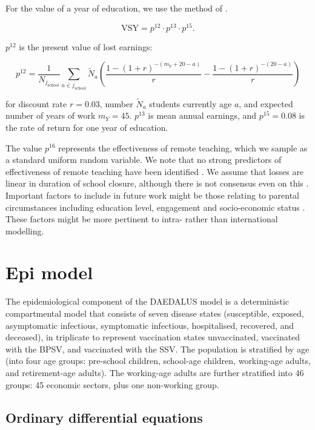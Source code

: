 \documentclass[
]{article}
\begin{document}
For the value of a year of education, we use the method of \citep{Psacharopoulos2021a}.

\[\text{VSY} =  p^{12}\cdot p^{13}\cdot p^{15}.\]

\(p^{12}\) is the present value of lost earnings:

\[p^{12} = \frac{1}{N_{j_{\text{school}}}}\sum_{a\in j_{\text{school}}}\tilde{N}_a\left( \frac{1-(1+r)^{-(m_Y+20-a)}}{r} -  \frac{1-(1+r)^{-(20-a)}}{r}\right)\]

for discount rate \(r=0.03\), number \(\tilde{N}_a\) students currently age \(a\), and expected number of years of work \(m_Y=45\). \(p^{13}\) is mean annual earnings, and \(p^{15}=0.08\) is the rate of return for one year of education.

The value \(p^{16}\) represents the effectiveness of remote teaching, which we sample as a standard uniform random variable. We note that no strong predictors of effectiveness of remote teaching have been identified \citep{Patrinos2023}. We assume that losses are linear in duration of school closure, although there is not consensus even on this \citep{Betthauser2023}. Important factors to include in future work might be those relating to parental circumstances including education level, engagement and socio-economic status \citep{Moscoviz2022}. These factors might be more pertinent to intra- rather than international modelling.

\section{Epi model}\label{epi-model}

The epidemiological component of the DAEDALUS model is a deterministic compartmental model that consists of seven disease states (susceptible, exposed, asymptomatic infectious, symptomatic infectious, hospitalised, recovered, and deceased), in triplicate to represent vaccination states unvaccinated, vaccinated with the BPSV, and vaccinated with the SSV. The population is stratified by age (into four age groups: pre-school children, school-age children, working-age adults, and retirement-age adults). The working-age adults are further stratified into 46 groups: 45 economic sectors, plus one non-working group.

\subsection{Ordinary differential equations}\label{ordinary-differential-equations}
\end{document}
